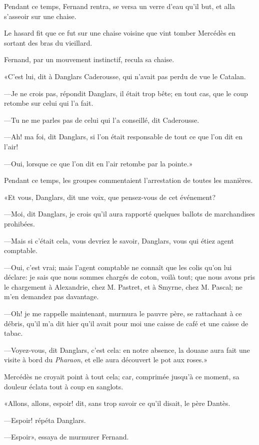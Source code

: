 Pendant ce temps, Fernand rentra, se versa un verre d'eau qu'il but, et alla s'asseoir sur une chaise.

Le hasard fit que ce fut sur une chaise voisine que vint tomber Mercédès en sortant des bras du vieillard.

Fernand, par un mouvement instinctif, recula sa chaise.

«C'est lui, dit à Danglars Caderousse, qui n'avait pas perdu de vue le Catalan.

—Je ne crois pas, répondit Danglars, il était trop bête; en tout cas, que le coup retombe sur celui qui l'a fait.

—Tu ne me parles pas de celui qui l'a conseillé, dit Caderousse.

—Ah! ma foi, dit Danglars, si l'on était responsable de tout ce que l'on dit en l'air!

—Oui, lorsque ce que l'on dit en l'air retombe par la pointe.»

Pendant ce temps, les groupes commentaient l'arrestation de toutes les manières.

«Et vous, Danglars, dit une voix, que pensez-vous de cet événement?

—Moi, dit Danglars, je crois qu'il aura rapporté quelques ballots de marchandises prohibées.

—Mais si c'était cela, vous devriez le savoir, Danglars, vous qui étiez agent comptable.

—Oui, c'est vrai; mais l'agent comptable ne connaît que les colis qu'on lui déclare: je sais que nous sommes chargés de coton, voilà tout; que nous avons pris le chargement à Alexandrie, chez M. Pastret, et à Smyrne, chez M. Pascal; ne m'en demandez pas davantage.

—Oh! je me rappelle maintenant, murmura le pauvre père, se rattachant à ce débris, qu'il m'a dit hier qu'il avait pour moi une caisse de café et une caisse de tabac.

—Voyez-vous, dit Danglars, c'est cela: en notre absence, la douane aura fait une visite à bord du \textit{Pharaon}, et elle aura découvert le pot aux roses.»

Mercédès ne croyait point à tout cela; car, comprimée jusqu'à ce moment, sa douleur éclata tout à coup en sanglots.

«Allons, allons, espoir! dit, sans trop savoir ce qu'il disait, le père Dantès.

—Espoir! répéta Danglars.

—Espoir», essaya de murmurer Fernand.

